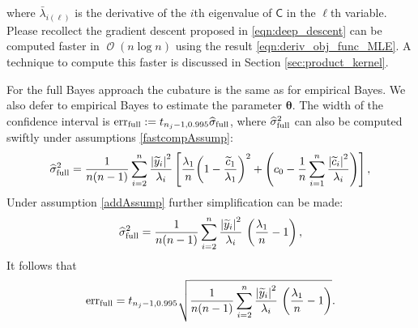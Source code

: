 \documentclass{iitthesis}          %
\DeclareMathOperator{\Order}{{\mathcal O}}
\newcommand{\bm}[1]{\boldsymbol{#1}}
\newcommand{\vtheta}{{\bm{\theta}}}
\newcommand{\vy}{\bm{y}}
\newcommand{\tvy}{\tilde{\bm{y}}}
\newcommand{\mC}{\mathsf{C}}
\newcommand{\hsigma}{\widehat{\sigma}}
\newcommand{\MLE}{\textup{EB}}
\newcommand{\err}{\textup{err}}
\def\abs#1{\ensuremath{\left \lvert #1 \right \rvert}}
\begin{document}
where $\bar{\lambda}_{i(\ell)}$ is the derivative of the $i$th eigenvalue of $\mC$ in the $\ell$th variable. Please recollect the gradient descent proposed in \eqref{eqn:deep_descent} can be computed faster in $\Order(n \log n)$ using the result \eqref{eqn:deriv_obj_func_MLE}. A technique to compute this faster is discussed in Section \ref{sec:product_kernel}. 

For the full Bayes approach the cubature is the same as for empirical Bayes.  We also defer to empirical Bayes to estimate the parameter $\vtheta$.  The width of the confidence interval is $\err_{\textup{full}} 
:= t_{n_j-1,0.995} \hsigma_{\textup{full}}$, where $\hsigma_{\textup{full}}^2$ can also be computed swiftly under assumptions \eqref{fastcompAssump}:
\begin{align*} %
\widehat{\sigma}^2_{\textup{full}} =
\frac{1}{n(n-1)} \sum_{i=2}^n \frac{\abs{\widetilde{y}_i}^2}{\lambda_i}
\left[\frac{\lambda_1}{n}{\left(1 - \frac{\widetilde{c}_1}{\lambda_1}\right)^2} + \left(c_0  - \frac 1n \sum_{i=1}^n \frac{\abs{\widetilde{c}_i}^2}{\lambda_i}\right) \right],
\end{align*}
Under assumption \eqref{addAssump} further simplification can be made:
\begin{equation*} %
\widehat{\sigma}^2_{\textup{full}}
=
\frac{1}{n(n-1)} \sum_{i=2}^n \frac{\abs{\widetilde{y}_i}^2}{\lambda_i} \, \left(\frac{\lambda_1}{n}  - 1  \right),
\end{equation*}
It follows that
\begin{equation*} %
\err_{\textup{full}}
=
t_{n_j-1,0.995}
\sqrt{\frac{1}{n(n-1)} \sum_{i=2}^n \frac{\abs{\widetilde{y}_i}^2}{\lambda_i} \, \left(\frac{\lambda_1}{n}  - 1  \right)}.
\end{equation*}
\end{document}
